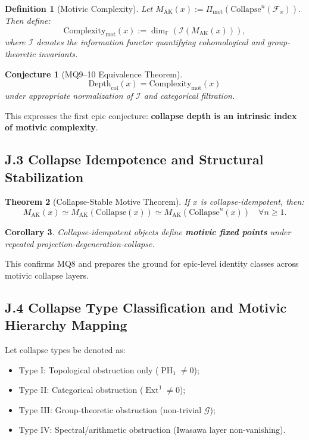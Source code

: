 \documentclass[11pt]{article}
\newtheorem{theorem}{Theorem}[section]
\newtheorem{definition}[theorem]{Definition}
\newtheorem{corollary}[theorem]{Corollary}
\newtheorem{conjecture}{Conjecture}[section]
\DeclareMathOperator{\Ext}{Ext}
\DeclareMathOperator{\PH}{PH}
\begin{document}
\begin{definition}[Motivic Complexity]
Let $M_{\mathrm{AK}}(x) := \Pi_{\mathrm{mot}}(\mathrm{Collapse}^n(\mathcal{F}_x))$. Then define:
\[
\mathrm{Complexity}_{\mathrm{mot}}(x) := \dim_{\mathbb{F}}(\mathcal{I}(M_{\mathrm{AK}}(x))),
\]
where $\mathcal{I}$ denotes the information functor quantifying cohomological and group-theoretic invariants.
\end{definition}

\begin{conjecture}[MQ9--10 Equivalence Theorem]
\[
\mathrm{Depth}_{\mathrm{col}}(x) = \mathrm{Complexity}_{\mathrm{mot}}(x)
\]
under appropriate normalization of $\mathcal{I}$ and categorical filtration.
\end{conjecture}

This expresses the first epic conjecture: \textbf{collapse depth is an intrinsic index of motivic complexity}.

\subsection*{J.3 Collapse Idempotence and Structural Stabilization}

\begin{theorem}[Collapse-Stable Motive Theorem]
If $x$ is collapse-idempotent, then:
\[
M_{\mathrm{AK}}(x) \simeq M_{\mathrm{AK}}(\mathrm{Collapse}(x)) \simeq M_{\mathrm{AK}}(\mathrm{Collapse}^n(x)) \quad \forall n \geq 1.
\]
\end{theorem}

\begin{corollary}
Collapse-idempotent objects define \textbf{motivic fixed points} under repeated projection-degeneration-collapse.
\end{corollary}

This confirms MQ8 and prepares the ground for epic-level identity classes across motivic collapse layers.

\subsection*{J.4 Collapse Type Classification and Motivic Hierarchy Mapping}

Let collapse types be denoted as:

\begin{itemize}
    \item Type I: Topological obstruction only ($\PH_1 \neq 0$);
    \item Type II: Categorical obstruction ($\Ext^1 \neq 0$);
    \item Type III: Group-theoretic obstruction (non-trivial $\mathcal{G}$);
    \item Type IV: Spectral/arithmetic obstruction (Iwasawa layer non-vanishing).
\end{itemize}
\end{document}
